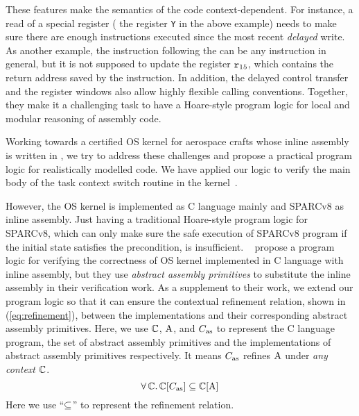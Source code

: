 These features make the semantics of the \sparc{} code
context-dependent. For instance, a read of a special register
(\eg{} the register {\tt Y} in the above example) needs to
make sure there are enough instructions executed since the
most recent {\em delayed} write. As another example,
the instruction following the \call{} can be any
instruction in general, but it is not supposed to
update the register $\texttt{r}_{15}$, which contains the return
address saved by the \call{} instruction.
In addition,
the delayed control transfer
and the register windows also allow highly flexible calling
conventions. Together, they make it a challenging task
to have a Hoare-style program logic for local and modular
reasoning of \sparc{} assembly code.

Working towards a certified OS kernel for aerospace
crafts whose inline assembly is written in \sparc,
we try to address these challenges and propose a practical
program logic for realistically modelled \sparc{} code.
We have applied our logic to verify the main body of
the task context switch routine in the kernel~\cite{zha18aplas}.

However, the OS kernel is implemented as
C language mainly and SPARCv8 as inline assembly.
Just having a traditional Hoare-style
program logic for SPARCv8, which can only make sure
the safe execution of SPARCv8 program if the initial
state satisfies the precondition, is insufficient.
~\cite{Xu16cav} propose a program logic for
verifying the correctness of OS kernel implemented in
C language with inline assembly,
but they use {\em abstract assembly primitives} to
substitute the inline assembly in their verification work.
As a supplement to their work, we extend our
program logic so that it can ensure the
contextual refinement relation,
shown in (\ref{eq:refinement}),
between the implementations and
their corresponding abstract assembly primitives.
Here, we use $\mathbb{C}$, $\text{A}$,
and $C_{\text{as}}$ to represent the C language program,
the set of abstract assembly
primitives and the implementations of
abstract assembly primitives respectively.
It means $C_{\text{as}}$ refines $\text{A}$ under
\textit{any context} $\mathbb{C}$.
\begin{equation}
    \forall \, \mathbb{C}. \,
    \mathbb{C}[C_{\text{as}}] \subseteq \mathbb{C}[\text{A}]
    \label{eq:refinement}
\end{equation}
%
Here we use ``$\subseteq$'' to represent the refinement
relation.
%

